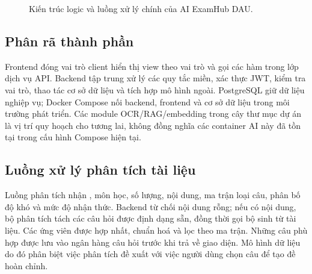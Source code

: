 \begin{figure}[H]
\centering
{}
\caption{Kiến trúc logic và luồng xử lý chính của AI ExamHub DAU.}
\label{fig:kientruc}
\end{figure}

\subsection{Phân rã thành phần}
Frontend đóng vai trò client hiển thị view theo vai trò và gọi các hàm
trong lớp dịch vụ API. Backend tập trung xử lý các quy tắc miền, xác thực
JWT, kiểm tra vai trò, thao tác cơ sở dữ liệu và tích hợp mô hình ngoài.
PostgreSQL giữ dữ liệu nghiệp vụ; Docker Compose nối backend, frontend và
cơ sở dữ liệu trong môi trường phát triển. Các module OCR/RAG/embedding
trong cây thư mục dự án là vị trí quy hoạch cho tương lai, không đồng nghĩa
các container AI này đã tồn tại trong cấu hình Compose hiện tại.

\subsection{Luồng xử lý phân tích tài liệu}
Luồng phân tích nhận , môn học, số lượng, nội dung, ma
trận loại câu, phân bố độ khó và mức độ nhận thức. Backend từ chối nội
dung rỗng; nếu có nội dung, bộ phân tích tách các câu hỏi được định dạng
sẵn, đồng thời gọi bộ sinh từ tài liệu. Các ứng viên được hợp nhất, chuẩn
hoá và lọc theo ma trận. Những câu phù hợp được lưu vào ngân hàng câu hỏi
trước khi trả về giao diện. Mô hình dữ liệu do đó phân biệt việc phân tích
đề xuất với việc người dùng chọn câu để tạo đề hoàn chỉnh.

